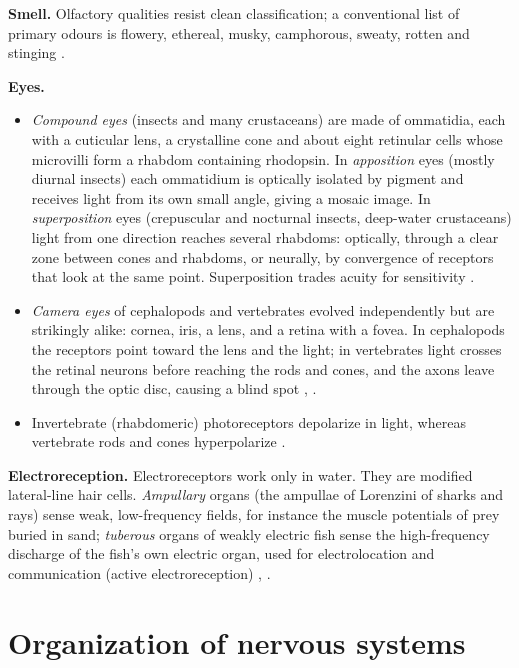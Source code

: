 \textbf{Smell.}
Olfactory qualities resist clean
classification; a conventional list of
primary odours is flowery, ethereal,
musky, camphorous, sweaty, rotten and
stinging \cite[Chapter
8]{schmidt1981sensory}.

\textbf{Eyes.}
\begin{itemize}
\item \emph{Compound eyes} (insects and
many crustaceans) are made of ommatidia,
each with a cuticular lens, a crystalline
cone and about eight retinular cells
whose microvilli form a rhabdom
containing rhodopsin. In
\emph{apposition} eyes (mostly diurnal
insects) each ommatidium is optically
isolated by pigment and receives light
from its own small angle, giving a
mosaic image. In \emph{superposition}
eyes (crepuscular and nocturnal insects,
deep-water crustaceans) light from one
direction reaches several rhabdoms:
optically, through a clear zone between
cones and rhabdoms, or neurally, by
convergence of receptors that look at the
same point. Superposition trades acuity
for sensitivity \cite[Section
9.8.4]{willmer2005environmental}.
\item \emph{Camera eyes} of cephalopods
and vertebrates evolved independently
but are strikingly alike: cornea, iris,
a lens, and a retina with a fovea. In
cephalopods the receptors point toward
the lens and the light; in vertebrates
light crosses the retinal neurons before
reaching the rods and cones, and the
axons leave through the optic disc,
causing a blind spot \cite[Section
9.8.4]{willmer2005environmental},
\cite[Chapter 14]{hill2012animal}.
\item Invertebrate (rhabdomeric)
photoreceptors depolarize in light,
whereas vertebrate rods and cones
hyperpolarize
\cite[Section
9.8.4]{willmer2005environmental}.
\end{itemize}

\textbf{Electroreception.}
Electroreceptors work only in water. They
are modified lateral-line hair cells.
\emph{Ampullary} organs (the ampullae of
Lorenzini of sharks and rays) sense weak,
low-frequency fields, for instance the
muscle potentials of prey buried in sand;
\emph{tuberous} organs of weakly electric
fish sense the high-frequency discharge
of the fish's own electric organ, used
for electrolocation and communication
(active electroreception)
\cite[Section
9.8.6]{willmer2005environmental},
\cite[Chapter 7]{randall1997eckert}.

\section{Organization of nervous systems}
\label{section-nervous-system}

